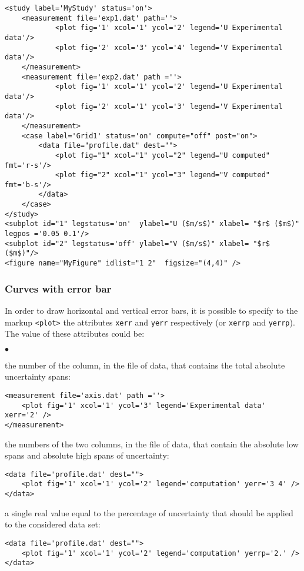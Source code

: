 \documentclass[a4paper,10pt,twoside]{csshortdoc}
\begin{document}
\small
\begin{verbatim}
<study label='MyStudy' status='on'>
    <measurement file='exp1.dat' path=''>
            <plot fig='1' xcol='1' ycol='2' legend='U Experimental data'/>
            <plot fig='2' xcol='3' ycol='4' legend='V Experimental data'/>
    </measurement>
    <measurement file='exp2.dat' path =''>
            <plot fig='1' xcol='1' ycol='2' legend='U Experimental data'/>
            <plot fig='2' xcol='1' ycol='3' legend='V Experimental data'/>
    </measurement>
    <case label='Grid1' status='on' compute="off" post="on">
        <data file="profile.dat" dest="">
            <plot fig="1" xcol="1" ycol="2" legend="U computed" fmt='r-s'/>
            <plot fig="2" xcol="1" ycol="3" legend="V computed" fmt='b-s'/>
        </data>
    </case>
</study>
<subplot id="1" legstatus='on'  ylabel="U ($m/s$)" xlabel= "$r$ ($m$)" legpos ='0.05 0.1'/>
<subplot id="2" legstatus='off' ylabel="V ($m/s$)" xlabel= "$r$ ($m$)"/>
<figure name="MyFigure" idlist="1 2"  figsize="(4,4)" />
\end{verbatim}
\normalsize

\subsubsection{Curves with error bar}\label{sec:err}

In order to draw horizontal and vertical error bars, it is possible to
specify to the markup \texttt{<plot>} the attributes \texttt{xerr} and
\texttt{yerr} respectively (or \texttt{xerrp} and \texttt{yerrp}). The
value of these attributes could be:
\begin{list}{$\bullet$}{}
\item the number of the column, in the file of data, that contains the total
absolute uncertainty spans:
\small
\begin{verbatim}
<measurement file='axis.dat' path =''>
    <plot fig='1' xcol='1' ycol='3' legend='Experimental data' xerr='2' />
</measurement>
\end{verbatim}
\normalsize
\item the numbers of the two columns, in the file of data, that contain the
absolute low spans and absolute high spans of uncertainty:
\small
\begin{verbatim}
<data file='profile.dat' dest="">
    <plot fig='1' xcol='1' ycol='2' legend='computation' yerr='3 4' />
</data>
\end{verbatim}
\normalsize
\item a single real value equal to the percentage of uncertainty that should be
applied to the considered data set:
\small
\begin{verbatim}
<data file='profile.dat' dest="">
    <plot fig='1' xcol='1' ycol='2' legend='computation' yerrp='2.' />
</data>
\end{verbatim}
\normalsize
\end{list}
\end{document}
